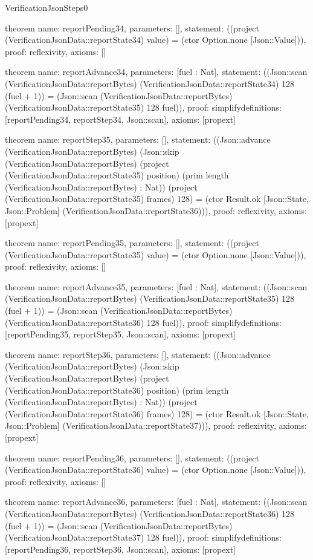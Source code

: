 \begin{lexlean}{VerificationJsonSteps0}
\begin{semanticmodule}
theorem{
  name: reportPending34,
  parameters: [],
  statement: ((project (VerificationJsonData::reportState34) value) = (ctor Option.none [Json::Value])),
  proof: reflexivity{},
  axioms: []
}

theorem{
  name: reportAdvance34,
  parameters: [fuel : Nat],
  statement: ((Json::scan (VerificationJsonData::reportBytes) (VerificationJsonData::reportState34) 128 (fuel + 1)) = (Json::scan (VerificationJsonData::reportBytes) (VerificationJsonData::reportState35) 128 fuel)),
  proof: simplify{definitions: [reportPending34, reportStep34, Json::scan]},
  axioms: [propext]
}

theorem{
  name: reportStep35,
  parameters: [],
  statement: ((Json::advance (VerificationJsonData::reportBytes) (Json::skip (VerificationJsonData::reportBytes) (project (VerificationJsonData::reportState35) position) (prim length (VerificationJsonData::reportBytes) : Nat)) (project (VerificationJsonData::reportState35) frames) 128) = (ctor Result.ok [Json::State, Json::Problem] (VerificationJsonData::reportState36))),
  proof: reflexivity{},
  axioms: [propext]
}

theorem{
  name: reportPending35,
  parameters: [],
  statement: ((project (VerificationJsonData::reportState35) value) = (ctor Option.none [Json::Value])),
  proof: reflexivity{},
  axioms: []
}

theorem{
  name: reportAdvance35,
  parameters: [fuel : Nat],
  statement: ((Json::scan (VerificationJsonData::reportBytes) (VerificationJsonData::reportState35) 128 (fuel + 1)) = (Json::scan (VerificationJsonData::reportBytes) (VerificationJsonData::reportState36) 128 fuel)),
  proof: simplify{definitions: [reportPending35, reportStep35, Json::scan]},
  axioms: [propext]
}

theorem{
  name: reportStep36,
  parameters: [],
  statement: ((Json::advance (VerificationJsonData::reportBytes) (Json::skip (VerificationJsonData::reportBytes) (project (VerificationJsonData::reportState36) position) (prim length (VerificationJsonData::reportBytes) : Nat)) (project (VerificationJsonData::reportState36) frames) 128) = (ctor Result.ok [Json::State, Json::Problem] (VerificationJsonData::reportState37))),
  proof: reflexivity{},
  axioms: [propext]
}

theorem{
  name: reportPending36,
  parameters: [],
  statement: ((project (VerificationJsonData::reportState36) value) = (ctor Option.none [Json::Value])),
  proof: reflexivity{},
  axioms: []
}

theorem{
  name: reportAdvance36,
  parameters: [fuel : Nat],
  statement: ((Json::scan (VerificationJsonData::reportBytes) (VerificationJsonData::reportState36) 128 (fuel + 1)) = (Json::scan (VerificationJsonData::reportBytes) (VerificationJsonData::reportState37) 128 fuel)),
  proof: simplify{definitions: [reportPending36, reportStep36, Json::scan]},
  axioms: [propext]
}


\end{semanticmodule}
\end{lexlean}
